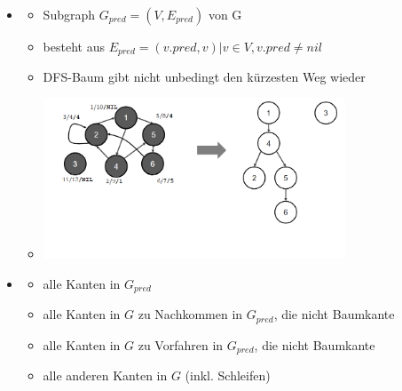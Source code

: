 \documentclass[
    12pt,
    a4paper,
    ngerman,
    color=3b,%
    marginpar=false,
    colorback=false,
    leqno,
]{tudaexercise}
\begin{document}
\begin{itemize}
        \item {}
            \begin{itemize}
                \item Subgraph $G_{pred}=(V,E_{pred})$ von G
                \item besteht aus $E_{pred} = {(v.pred,v)|v \in V, v.pred \neq nil}$
                \item DFS-Baum gibt nicht unbedingt den kürzesten Weg wieder
                \item[] \includegraphics[width=9cm]{pictures/dfswald.PNG}
            \end{itemize}
        \vspace*{-2cm}
        \item {}
            \begin{itemize}
                \item {} alle Kanten in $G_{pred}$
                \item {} alle Kanten in $G$ zu Nachkommen in $G_{pred}$, die nicht Baumkante
                \item {} alle Kanten in $G$ zu Vorfahren in $G_{pred}$, die nicht Baumkante
                \item {} alle anderen Kanten in $G$ (inkl. Schleifen)
            \end{itemize}


\end{itemize}
\end{document}
